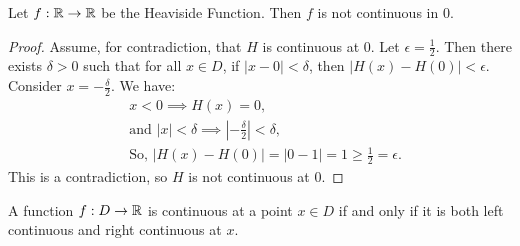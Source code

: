 \begin{theorem}
    Let $f: \mathbb{R} \to \mathbb{R}$ be the Heaviside Function. Then $f$ is not continuous in $0$.
\end{theorem}

\begin{proof}
    Assume, for contradiction, that $H$ is continuous at 0. Let $\epsilon = \frac{1}{2}$. Then there exists $\delta > 0$ such that for all $x \in D$, if $|x - 0| < \delta$, then $|H(x) - H(0)| < \epsilon$. Consider $x = -\frac{\delta}{2}$. We have:
    \begin{align*}
    & x < 0 \implies H(x) = 0, \\
    & \text{and } |x| < \delta \implies |-\frac{\delta}{2}| < \delta, \\
    & \text{So, } |H(x) - H(0)| = |0 - 1| = 1 \geq \frac{1}{2} = \epsilon.
    \end{align*}
    This is a contradiction, so $H$ is not continuous at $0$.
\end{proof}




\pagebreak

\begin{theorem}
    A function $f : D \to \mathbb{R}$ is continuous at a point $x \in D$ if and only if it is both left continuous and right continuous at $x$.
\end{theorem}

